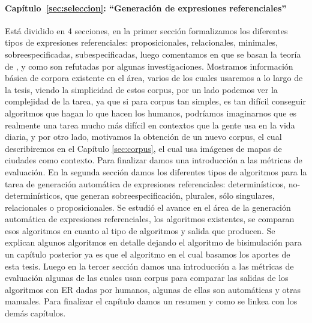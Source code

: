 \paragraph{Cap\'itulo~\ref{sec:seleccion}: ``Generaci\'on de expresiones referenciales''} Est\'a dividido en 4 secciones, en la primer secci\'on formalizamos los diferentes tipos de expresiones referenciales: proposicionales, relacionales, minimales, sobreespecificadas, subespecificadas, luego comentamos en que se basan la teor\'ia de \cite{clark1992arenas}, \cite{Clark-Marshall81} y como son refutadas por algunas investigaciones. Mostramos informaci\'on b\'asica de corpora existente en el \'area, varios de los cuales usaremos a lo largo de la tesis, viendo la simplicidad de estos corpus, por un lado podemos ver la complejidad de la tarea, ya que si para corpus tan simples, es tan dif\'icil conseguir algoritmos que hagan lo que hacen los humanos, podr\'iamos imaginarnos que es realmente una tarea mucho m\'as dif\'icil en contextos que la gente usa en la vida diaria, y por otro lado, motivamos la obtenci\'on de un nuevo  corpus, el cual describiremos en el Cap\'itulo \ref{sec:corpus}, el cual usa im\'agenes de mapas de ciudades como contexto. Para finalizar damos una introducci\'on a las m\'etricas de evaluaci\'on. En la segunda secci\'on damos los diferentes tipos de algoritmos para la tarea de generaci\'on autom\'atica de expresiones referenciales: determin\'isticos, no-determin\'isticos, que generan sobreespecificaci\'on, plurales, s\'olo singulares, relacionales o proposicionales. Se estudi\'o el avance en el \'area de la generaci\'on autom\'atica de expresiones referenciales, los algoritmos existentes, se comparan esos algoritmos en cuanto al tipo de algoritmos y salida que producen. Se explican algunos algoritmos en detalle dejando el algoritmo de bisimulaci\'on para un cap\'itulo posterior ya es que el algoritmo en el cual basamos los aportes de esta tesis. Luego en la tercer secci\'on damos una introducci\'on a las m\'etricas de evaluaci\'on algunas de las cuales usan corpus para comparar las salidas de los algoritmos con ER dadas por humanos, algunas de ellas son autom\'aticas y otras manuales. Para finalizar el cap\'itulo damos un resumen y como se linkea con los dem\'as cap\'itulos.



